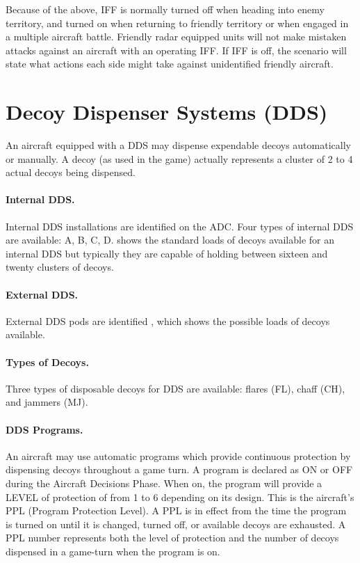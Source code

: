 \begin{advancedrules}
Because of the above, IFF is normally turned off when heading into enemy territory, and turned on when returning to friendly territory or when engaged in a multiple aircraft battle. Friendly radar equipped units will not make mistaken attacks against an aircraft with an operating IFF. If IFF is off, the scenario will state what actions each side might take against unidentified friendly aircraft.


\section{Decoy Dispenser Systems (DDS)}
\label{rule:dds}

An aircraft equipped with a DDS may dispense expendable decoys automatically or manually. A decoy (as used in the game) actually represents a cluster of 2 to 4 actual decoys being dispensed.


\paragraph{Internal DDS.} Internal DDS installations are identified on the ADC. Four types of internal DDS are available: A, B, C, D.  shows the standard loads of decoys available for an internal DDS but typically they are capable of holding between sixteen and twenty clusters of decoys.

\paragraph{External DDS.} External DDS pods are identified , which shows the possible loads of decoys available.

\paragraph{Types of Decoys.} Three types of disposable decoys for DDS are available: flares (FL), chaff (CH), and jammers (MJ).

\paragraph{DDS Programs.} An aircraft may use automatic programs which provide continuous protection by dispensing decoys throughout a game turn. A program is declared as ON or OFF during the Aircraft Decisions Phase. When on, the program will provide a LEVEL of protection of from 1 to 6 depending on its design. This is the aircraft's PPL (Program Protection Level). A PPL is in effect from the time the program is turned on until it is changed, turned off, or available decoys are exhausted. A PPL number represents both the level of protection and the number of decoys dispensed in a game-turn when the program is on.


\end{advancedrules}
